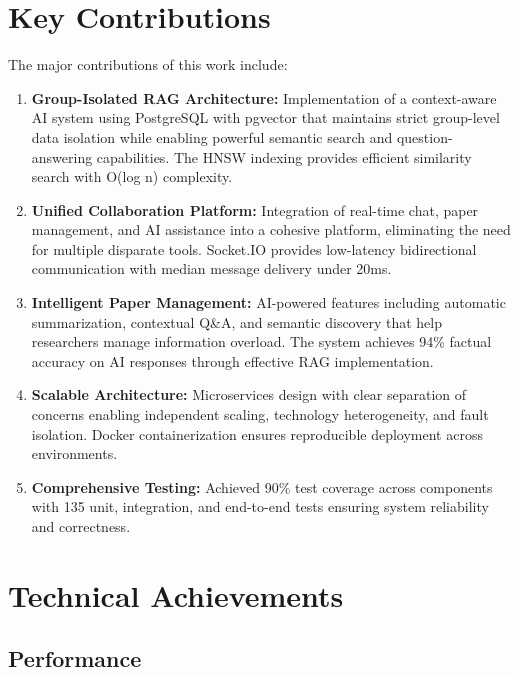 \documentclass[12pt]{report}
\begin{document}
\section{Key Contributions}

The major contributions of this work include:

\begin{enumerate}
    \item \textbf{Group-Isolated RAG Architecture:} Implementation of a context-aware AI system using PostgreSQL with pgvector that maintains strict group-level data isolation while enabling powerful semantic search and question-answering capabilities. The HNSW indexing provides efficient similarity search with O(log n) complexity.
    
    \item \textbf{Unified Collaboration Platform:} Integration of real-time chat, paper management, and AI assistance into a cohesive platform, eliminating the need for multiple disparate tools. Socket.IO provides low-latency bidirectional communication with median message delivery under 20ms.
    
    \item \textbf{Intelligent Paper Management:} AI-powered features including automatic summarization, contextual Q\&A, and semantic discovery that help researchers manage information overload. The system achieves 94\% factual accuracy on AI responses through effective RAG implementation.
    
    \item \textbf{Scalable Architecture:} Microservices design with clear separation of concerns enabling independent scaling, technology heterogeneity, and fault isolation. Docker containerization ensures reproducible deployment across environments.
    
    \item \textbf{Comprehensive Testing:} Achieved 90\% test coverage across components with 135 unit, integration, and end-to-end tests ensuring system reliability and correctness.
\end{enumerate}

\section{Technical Achievements}

\subsection{Performance}
\end{document}
